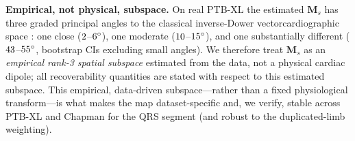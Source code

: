 \textbf{Empirical, not physical, subspace.} On real PTB-XL the estimated $\bm M_s$ has three
graded principal angles to the classical inverse-Dower vectorcardiographic space
\cite{edenbrandt1988dower,kors1990vcg}: one close ($2$--$6^\circ$), one
moderate ($10$--$15^\circ$), and one substantially different
($43$--$55^\circ$, bootstrap CIs excluding small angles). We therefore treat $\bm M_s$ as an \emph{empirical rank-3 spatial subspace}
estimated from the data, not a physical cardiac dipole; all recoverability quantities are stated
with respect to this estimated subspace. This empirical, data-driven subspace---rather than a
fixed physiological transform---is what makes the map dataset-specific and, we verify, stable
across PTB-XL and Chapman for the QRS segment (and robust to the duplicated-limb weighting).